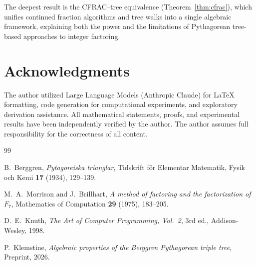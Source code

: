 \documentclass[12pt]{amsart}
\theoremstyle{definition}
\theoremstyle{remark}
\begin{document}
The deepest result is the CFRAC--tree equivalence (Theorem~\ref{thm:cfrac}),
which unifies continued fraction algorithms and tree walks into a single
algebraic framework, explaining both the power and the limitations of
Pythagorean tree-based approaches to integer factoring.

\section*{Acknowledgments}
The author utilized Large Language Models (Anthropic Claude) for \LaTeX{}
formatting, code generation for computational experiments, and exploratory
derivation assistance. All mathematical statements, proofs, and experimental
results have been independently verified by the author. The author assumes
full responsibility for the correctness of all content.

\begin{thebibliography}{99}

B.~Berggren,
\emph{Pytagoreiska trianglar},
Tidskrift f\"or Elementar Matematik, Fysik och Kemi \textbf{17} (1934), 129--139.

M.~A.~Morrison and J.~Brillhart,
\emph{A method of factoring and the factorization of $F_7$},
Mathematics of Computation \textbf{29} (1975), 183--205.

D.~E.~Knuth,
\emph{The Art of Computer Programming, Vol.~2},
3rd ed., Addison-Wesley, 1998.

P.~Klemstine,
\emph{Algebraic properties of the Berggren Pythagorean triple tree},
Preprint, 2026.

\end{thebibliography}
\end{document}

